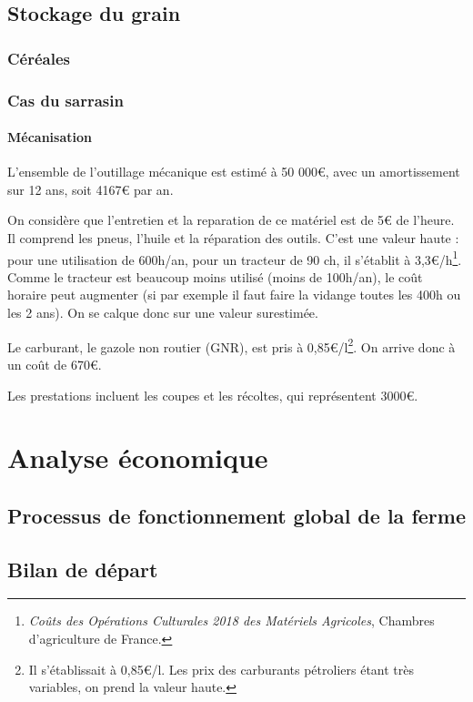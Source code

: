 \documentclass{book}
\begin{document}
\section{Stockage du grain}

\subsection{Céréales}

\subsection{Cas du sarrasin}

\subsubsection{Mécanisation}

L'ensemble de l'outillage mécanique est estimé à 50 000\euro{}, avec un amortissement sur 12 ans, soit 4167\euro{} par an.

On considère que l'entretien et la reparation de ce matériel est de 5\euro{} de l'heure. Il comprend les pneus, l'huile et la réparation des outils. C'est une valeur haute : pour une utilisation de 600h/an, pour un tracteur de 90 ch, il s'établit à 3,3\euro{}/h\footnote{\textit{Coûts des Opérations Culturales 2018 des Matériels Agricoles}, Chambres d'agriculture de France.}. Comme le tracteur est beaucoup moins utilisé (moins de 100h/an), le coût horaire peut augmenter (si par exemple il faut faire la vidange toutes les 400h ou les 2 ans). On se calque donc sur une valeur surestimée.

Le carburant, le gazole non routier (GNR), est pris à 0,85\euro{}/l\footnote{Il s'établissait à 0,85\euro{}/l. Les prix des carburants pétroliers étant très variables, on prend la valeur haute.}. On arrive donc à un coût de 670\euro{}.

Les prestations incluent les coupes et les récoltes, qui représentent 3000\euro{}.

\chapter{Analyse économique}

\section{Processus de fonctionnement global de la ferme}

\section{Bilan de départ}
\end{document}
